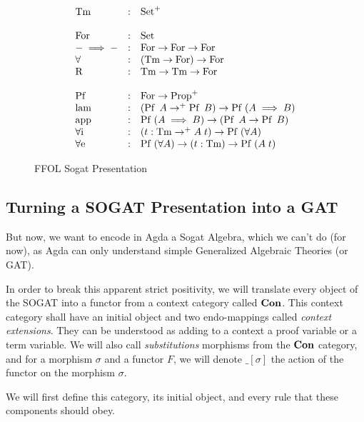 \documentclass[10pt,a4paper]{article}
\begin{document}
		\begin{figure}
		\begin{tcolorbox}
			\[
			\begin{array}{lcl}
				\operatorname{Tm} & : & \operatorname{Set}^+ \\
				\\
				\operatorname{For} & : & \operatorname{Set} \\
				- \implies - & : & \operatorname{For} \rightarrow \operatorname{For} \rightarrow \operatorname{For}\\
				\forall & : & (\operatorname{Tm} \rightarrow \operatorname{For}) \rightarrow \operatorname{For} \\
				\operatorname{R} & : & \operatorname{Tm} \rightarrow \operatorname{Tm} \rightarrow \operatorname{For}\\
				\\
				\operatorname{Pf}\; & : & \operatorname{For} \rightarrow \operatorname{Prop}^+ \\
				\operatorname{lam} & : & (\operatorname{Pf}\; A \rightarrow^+ \operatorname{Pf}\; B) \rightarrow \operatorname{Pf}\; (A \implies B)\\
				\operatorname{app} & : & \operatorname{Pf}\; (A \implies B) \rightarrow (\operatorname{Pf}\; A \rightarrow \operatorname{Pf}\; B)\\
				\operatorname{\operatorname{\forall i}} & : & (t : \operatorname{Tm} \rightarrow^+ A\;t) \rightarrow \operatorname{Pf}\; (\forall A)\\
				\operatorname{\operatorname{\forall e}} & : & \operatorname{Pf}\; (\forall A) \rightarrow (t : \operatorname{Tm}) \rightarrow \operatorname{Pf}\; (A\;t)\\
			\end{array}
			\]
		\end{tcolorbox}
		\caption{FFOL Sogat Presentation}
		\label{fig:ffol-sogat}
		\end{figure}
	
		\subsection{Turning a SOGAT Presentation into a GAT}
		
			But now, we want to encode in Agda a Sogat Algebra, which we can't do (for now), as Agda can only understand simple Generalized Algebraic Theories (or GAT).
			
			In order to break this apparent strict positivity, we will translate every object of the SOGAT into a functor from a context category called $\textbf{Con}$. This context category shall have an initial object and two endo-mappings called \emph{context extensions}. They can be understood as adding to a context a proof variable or a term variable. We will also call \emph{substitutions} morphisms from the $\textbf{Con}$ category, and for a morphism $\sigma$ and a functor $F$, we will denote $\_\left[\sigma\right]$ the action of the functor on the morphism $\sigma$.
			
			We will first define this category, its initial object, and every rule that these components should obey.
			\begin{tcolorbox}
				\vspace{-2ex}
				\vspace{-7.5ex}
			\end{tcolorbox}
		
\end{document}
